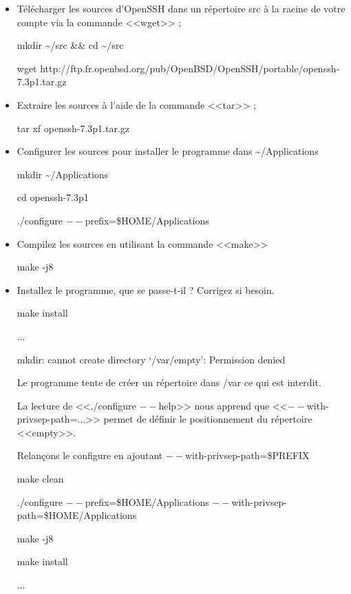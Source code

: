 \documentclass[11pt]{article}
\begin{document}
\begin{itemize}
 \item Télécharger les sources d'OpenSSH dans un répertoire src à la racine de votre compte via la commande <<wget>> ;
\begin{solution}

 mkdir \textasciitilde{}/src \&\& cd \textasciitilde{}/src

 wget http://ftp.fr.openbsd.org/pub/OpenBSD/OpenSSH/portable/openssh-7.3p1.tar.gz
\end{solution}
 \item Extraire les sources à l'aide de la commande <<tar>> ;
\begin{solution}
 tar xf openssh-7.3p1.tar.gz
\end{solution}
 \item Configurer les sources pour installer le programme dans \textasciitilde{}/Applications
\begin{solution}

 mkdir \textasciitilde{}/Applications

 cd openssh-7.3p1

 ./configure $--$prefix=\$HOME/Applications
\end{solution}
 \item Compilez les sources en utilisant la commande <<make>>
\begin{solution}
 make -j8
\end{solution}
 \item Installez le programme, que se passe-t-il ? Corrigez si besoin.
\begin{solution}

make install

...

mkdir: cannot create directory ‘/var/empty’: Permission denied

Le programme tente de créer un répertoire dans /var ce qui est interdit.

La lecture de <<./configure $--$help>> nous apprend que <<$--$with-privsep-path=...>> permet de définir le positionnement du répertoire <<empty>>. 

Relançons le configure en ajoutant $--$with-privsep-path=\$PREFIX

make clean

./configure $--$prefix=\$HOME/Applications $--$with-privsep-path=\$HOME/Applications

make -j8

make install

...


\end{solution}
\end{itemize}
\end{document}
